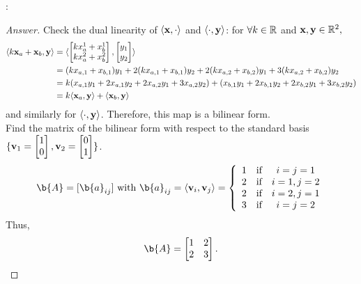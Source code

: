 \noindent {}:
\begin{proof}[Answer]
\label{answer:bf2}
 Check the dual linearity of $\langle \mathbf{x}, \cdot \rangle$ and $\langle \cdot, \mathbf{y} \rangle$: for $\forall k \in \mathbb{R}$ and $\mathbf{x},\mathbf{y} \in \mathbb{R}^2,$
%
\begin{align*}
    \langle k\mathbf{x}_a + \mathbf{x}_b, \mathbf{y} \rangle 
&= \langle
\begin{bmatrix}
    kx_a^1 + x_b^1\\
    kx_a^2 + x_b^2
\end{bmatrix}, 
\begin{bmatrix}
    y_1\\
    y_2
\end{bmatrix}
\rangle \\
&= (kx_{a,1} + x_{b,1})y_1 + 2(kx_{a,1} + x_{b,1})y_2 + 2(kx_{a,2} + x_{b,2})y_1 + 3(kx_{a,2} + x_{b,2})y_2\\
&= k (x_{a,1}y_1 + 2x_{a,1}y_2 + 2x_{a,2}y_1 + 3x_{a,2}y_2) + (x_{b,1}y_1 + 2x_{b,1}y_2 + 2x_{b,2}y_1 + 3x_{b,2}y_2) \\
&= k \langle \mathbf{x}_a, \mathbf{y} \rangle + \langle \mathbf{x}_b, \mathbf{y} \rangle
\end{align*}
%
and similarly for $\langle \cdot, \mathbf{y} \rangle$.
Therefore, this map is a bilinear form.\\

\noindent Find the matrix of the bilinear form with respect to the standard basis $\{ \mathbf{v}_1 =
\begin{bmatrix}
    1\\
    0
\end{bmatrix},
\mathbf{v}_2=
\begin{bmatrix}
    0\\
    1
\end{bmatrix} \}$.
%
\begin{equation*}
    \b{A} = [\b{a}_{ij}] \textnormal{  with  } \b{a}_{ij} 
    = \langle \vv_i, \vv_j \rangle
    =\left\{ 
    \begin{array}{ccc}
    1 &  \mbox{if}  & i=j=1  \\
    2 &  \mbox{if}  & i=1, j=2 \\
    2 &  \mbox{if}  & i=2, j=1 \\
    3 &  \mbox{if}  & i=j=2  \\
    \end{array}
    \right.
\end{equation*}
%
Thus,
$$\b{A}=
    \begin{bmatrix}
        1   &2  \\
        2   &3  \\
    \end{bmatrix}.
$$


\end{proof}
